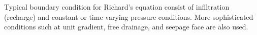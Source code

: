 Typical boundary condition for Richard's equation consist of
infiltration (recharge) and constant or time varying pressure
conditions. More sophisticated conditions such at unit gradient, free
drainage, and seepage face are also used.

%
% 

 






